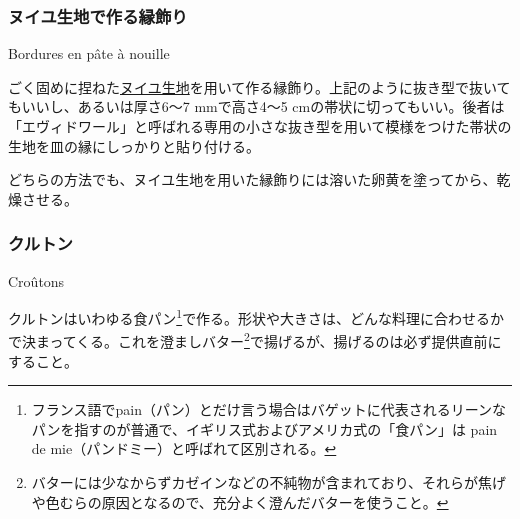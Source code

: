 \begin{recette}
\atoaki{}

\hypertarget{bordures-en-pate-a-nouille}{%
\subsubsection{ヌイユ生地で作る縁飾り}\label{bordures-en-pate-a-nouille}}

\begin{frsubenv}

Bordures en pâte à nouille

\end{frsubenv}


ごく固めに捏ねた\protect\hyperlink{nouilles}{ヌイユ生地}を用いて作る縁飾り。上記のように抜き型で抜いてもいいし、あるいは厚さ6〜7
mmで高さ4〜5
cmの帯状に切ってもいい。後者は「エヴィドワール」と呼ばれる専用の小さな抜き型を用いて模様をつけた帯状の生地を皿の縁にしっかりと貼り付ける。

どちらの方法でも、ヌイユ生地を用いた縁飾りには溶いた卵黄を塗ってから、乾燥させる。

\atoaki{}

\hypertarget{croutons}{%
\subsubsection{クルトン}\label{croutons}}

\begin{frsubenv}

Croûtons

\end{frsubenv}

 

クルトンはいわゆる食パン\footnote{フランス語でpain（パン）とだけ言う場合はバゲットに代表されるリーンなパンを指すのが普通で、イギリス式およびアメリカ式の「食パン」は
  pain de mie（パンドミー）と呼ばれて区別される。}で作る。形状や大きさは、どんな料理に合わせるかで決まってくる。これを澄ましバター\footnote{バターには少なからずカゼインなどの不純物が含まれており、それらが焦げや色むらの原因となるので、充分よく澄んだバターを使うこと。}で揚げるが、揚げるのは必ず提供直前にすること。


\end{recette}
